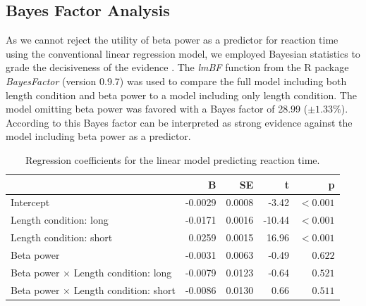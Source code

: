 \documentclass[man,floatsintext]{apa6} %
\begin{document}
\subsection{Bayes Factor Analysis}
As we cannot reject the utility of beta power as a predictor for
reaction time using the conventional linear regression model, we
employed Bayesian statistics to grade the decisiveness of the evidence
\cite{jeffreys_theory_1961}. The \emph{lmBF} function from the R
package \emph{BayesFactor} (version 0.9.7) was used to compare the
full model including both length condition and beta power to a model
including only length condition. The model omitting beta power was
favored with a Bayes factor of 28.99 ($\pm 1.33\%$). According to
 this Bayes factor can be interpreted as
strong evidence against the model including beta power as a predictor.


\begin{table}[!h]
  \caption{Regression coefficients for the linear model predicting reaction time.}
  \begin{flushleft}
    \begin{tabular}{lrrrr}
      \toprule
                                                    & B        & SE         & t       & p         \\
      \midrule
      Intercept                                     & -0.0029  & 0.0008     &  -3.42  & $< 0.001$ \\
      Length condition: long                        & -0.0171  & 0.0016     & -10.44  & $< 0.001$ \\
      Length condition: short                       &  0.0259  & 0.0015     &  16.96  & $< 0.001$ \\
      Beta power                                    & -0.0031  & 0.0063     &  -0.49  & $0.622$   \\
      Beta power $\times$ Length condition: long    & -0.0079  & 0.0123     &  -0.64  & $0.521$   \\
      Beta power $\times$ Length condition: short   & -0.0086  & 0.0130     &   0.66  & $0.511$   \\
      \bottomrule
    \end{tabular}
  \end{flushleft}
  \label{tbl:regression}
\end{table}
\end{document}
